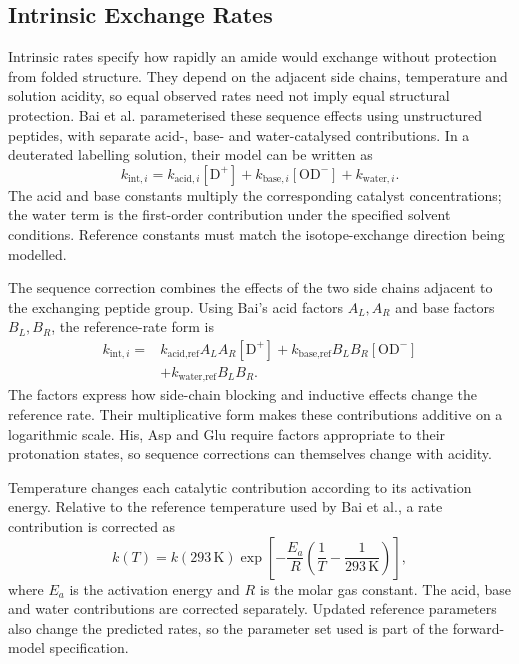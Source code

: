 \subsection{Intrinsic Exchange Rates}
\label{sec:bg-intrinsic-rates}

Intrinsic rates specify how rapidly an amide would exchange without protection from folded structure. They depend on the adjacent side chains, temperature and solution acidity, so equal observed rates need not imply equal structural protection. Bai et al. parameterised these sequence effects using unstructured peptides, with separate acid-, base- and water-catalysed contributions.\supercite{baiPrimaryStructureEffects1993} In a deuterated labelling solution, their model can be written as
\begin{equation}
    k_{\text{int},i}=
    k_{\text{acid},i}[\mathrm{D}^{+}]
    +k_{\text{base},i}[\mathrm{OD}^{-}]
    +k_{\text{water},i}.
    \label{eq:bg-intrinsic-rate}
\end{equation}
The acid and base constants multiply the corresponding catalyst concentrations; the water term is the first-order contribution under the specified solvent conditions. Reference constants must match the isotope-exchange direction being modelled.\supercite{connellyIsotopeEffectsPeptide1993}

The sequence correction combines the effects of the two side chains adjacent to the exchanging peptide group. Using Bai's acid factors $A_L,A_R$ and base factors $B_L,B_R$, the reference-rate form is
\begin{equation}
    \begin{split}
    k_{\text{int},i}={}&
    k_{\text{acid},\text{ref}}A_LA_R[\mathrm{D}^{+}]
    +k_{\text{base},\text{ref}}B_LB_R[\mathrm{OD}^{-}]\\
    &+k_{\text{water},\text{ref}}B_LB_R.
    \end{split}
    \label{eq:bg-sequence-rates}
\end{equation}
The factors express how side-chain blocking and inductive effects change the reference rate. Their multiplicative form makes these contributions additive on a logarithmic scale. His, Asp and Glu require factors appropriate to their protonation states, so sequence corrections can themselves change with acidity.\supercite{baiPrimaryStructureEffects1993}

Temperature changes each catalytic contribution according to its activation energy. Relative to the reference temperature used by Bai et al., a rate contribution is corrected as
\begin{equation}
    k(T)=k(293\,\mathrm{K})
    \exp\!\left[-\frac{E_a}{R}
    \left(\frac{1}{T}-\frac{1}{293\,\mathrm{K}}\right)\right],
    \label{eq:bg-rate-temperature}
\end{equation}
where $E_a$ is the activation energy and $R$ is the molar gas constant. The acid, base and water contributions are corrected separately.\supercite{baiPrimaryStructureEffects1993} Updated reference parameters also change the predicted rates, so the parameter set used is part of the forward-model specification.\supercite{nguyenReferenceParametersProtein2018}


